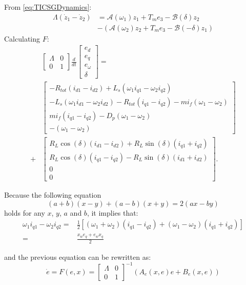 \documentclass[conference]{IEEEtran}
\begin{document}
From \eqref{eq:TICSGDynamics}:
$$
\begin{aligned}
\Lambda(\dot{z}_{1}-\dot{z}_{2})&=\mathcal{A}(\omega_{1})z_{1}+T_{m}e_{3}-\mathcal{B}(\delta)z_{2}\\&-\left(\mathcal{A}(\omega_{2})z_{2}+T_{m}e_{3}-\mathcal{B}(-\delta)z_{1}\right)
\end{aligned}
$$
Calculating  $F$:
$$
\begin{aligned}
&  \left[\begin{array}{cc}
\varLambda & 0\\
0 & 1
\end{array}\right] \frac{d}{dt}\left[\begin{array}{c}
e_{d}\\
e_{q}\\
e_{\omega}\\
\delta
\end{array}\right]  =  \\ & \left[\begin{array}{c}
-R_{tot}(i_{d1}-i_{d2})+L_{s}(\omega_{1}i_{q1}-\omega_{2}i_{q2})\\
-L_{s}(\omega_{1}i_{d1}-\omega_{2}i_{d2})-R_{tot}(i_{q1}-i_{q2})-mi_{f}(\omega_{1}-\omega_{2})\\
mi_{f}(i_{q1}-i_{q2})-D_{p}(\omega_{1}-\omega_{2})\\
-(\omega_{1}-\omega_{2})
\end{array}\right]\\
 + & \left[\begin{array}{c}
R_{L}\cos(\delta)(i_{d1}-i_{d2})+R_{L}\sin(\delta)(i_{q1}+i_{q2})\\
R_{L}\cos(\delta)(i_{q1}-i_{q2})-R_{L}\sin(\delta)(i_{d1}+i_{d2})\\
0\\
0
\end{array}\right].
\end{aligned}
$$

Because the following equation   
$$(a+b)(x-y)+(a-b)(x+y)=2(ax-by)$$
holds for any $x$, $y$, $a$ and $b$, it implies that:
$$
\begin{aligned}
\omega_{1}i_{q1}-\omega_{2}i_{q2}= &\frac{1}{2}\left[(\omega_{1}+\omega_{2})(i_{q1}-i_{q2})+(\omega_{1}-\omega_{2})(i_{q1}+i_{q2})\right] \\ =&\frac{x_{w}e_{q}+e_{w}x_{q}}{2}
\end{aligned}
$$

and the previous equation can be rewritten as:
$$
\dot{e}  = F(e,x) =\left[\begin{array}{cc}
\varLambda & 0\\
0 & 1
\end{array}\right]^{-1}\left(A_e\left(x,e\right) e +B_e\left(x,e\right)  \right)
$$
\end{document}
